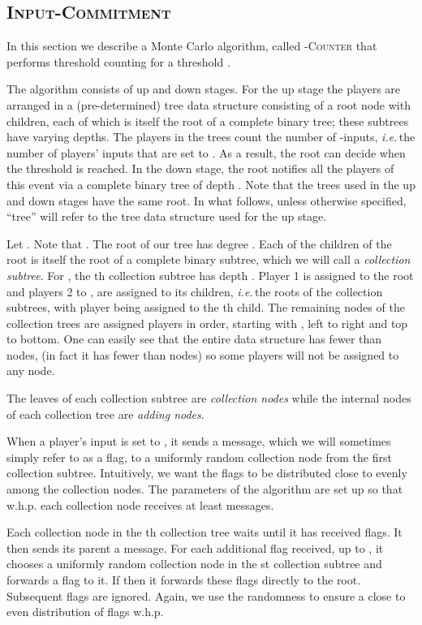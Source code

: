\documentclass[10pt]{llncs}
\newcommand{\ie}{\emph{i.e.\,}}
\newcommand{\whp}{w.h.p.\xspace}
\newcommand{\flag}{\xspace}
\newcommand{\countm}{\xspace}
\newcommand{\oneinputs}{-inputs\xspace}
\newcommand{\tc}{\textsc{-Counter}\xspace}
\newcommand{\ic}{\textsc{Input-Commitment}\xspace}
\begin{document}
\subsection{\ic} \label{sec:count}
In this section we describe a Monte Carlo algorithm,
called \tc that performs threshold counting for a threshold . 

The algorithm consists of up and down stages. For the up stage
the players are arranged in a (pre-determined)  tree data structure 
consisting of a root node with  children, each of which is 
itself the root of a complete binary tree; these subtrees have 
varying depths.  The players in the trees count the number of \oneinputs, 
\ie the number of players' inputs that are set to . As a
result, the root can decide when the threshold is reached. In the down stage, 
the root notifies all the players of this event via a complete 
binary tree of depth . Note that the trees used in the up and down 
stages have the same root. In what follows, unless otherwise specified, 
``tree'' will refer to the  tree data structure used for the up stage.

 
Let . Note that 
. The root of our tree has degree . Each of 
the  children of the root is itself the root of a complete 
binary subtree, which we will call a \emph{collection subtree}. 
For , the th collection subtree has depth . 
Player 1 is assigned to the root and players 2 to , are assigned to its 
children, \ie the roots of the collection subtrees, with player  being 
assigned to the th child. The remaining nodes of the collection trees are 
assigned players in order, starting with , left to right and top to 
bottom. One can easily see that the entire data structure has fewer than 
 nodes, (in fact it has fewer than  nodes) so 
some players will not be assigned to any node. 

The leaves of each collection subtree are \emph{collection nodes} 
while the internal nodes of each collection tree are
\emph{adding nodes}. 

When a player's input is set to , it sends a 
\flag message, which we will sometimes simply refer to as a flag, 
to a uniformly random collection node from the first collection subtree. 
Intuitively, we want the flags to be distributed close to evenly among 
the collection nodes.
The parameters of the algorithm are set up so that \whp each 
collection node receives at least  \flag messages.

Each collection node in the th collection tree waits until it has 
received  flags.
It then sends its parent a \countm message. For each additional flag 
received,  up to , it chooses a uniformly random collection 
node in the st collection subtree and forwards a flag 
to it. If  then it forwards these  flags 
directly to the root.
Subsequent flags are ignored. Again, we use the randomness to 
ensure a close to even distribution of flags \whp
\end{document}
